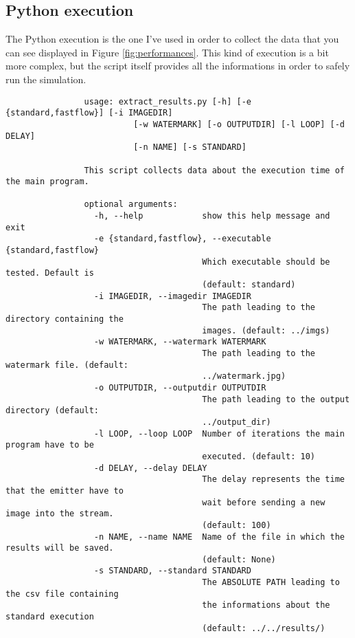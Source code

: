         \subsection{Python execution} %
        \label{sub:python_execution}
            The Python execution is the one I've used in order to collect the data that you can see displayed in
            Figure \ref{fig:performances}. This kind of execution is a bit more complex, but the script itself
            provides all the informations in order to safely run the simulation.

            \begin{verbatim}
                usage: extract_results.py [-h] [-e {standard,fastflow}] [-i IMAGEDIR]
                          [-w WATERMARK] [-o OUTPUTDIR] [-l LOOP] [-d DELAY]
                          [-n NAME] [-s STANDARD]

                This script collects data about the execution time of the main program.

                optional arguments:
                  -h, --help            show this help message and exit
                  -e {standard,fastflow}, --executable {standard,fastflow}
                                        Which executable should be tested. Default is
                                        (default: standard)
                  -i IMAGEDIR, --imagedir IMAGEDIR
                                        The path leading to the directory containing the
                                        images. (default: ../imgs)
                  -w WATERMARK, --watermark WATERMARK
                                        The path leading to the watermark file. (default:
                                        ../watermark.jpg)
                  -o OUTPUTDIR, --outputdir OUTPUTDIR
                                        The path leading to the output directory (default:
                                        ../output_dir)
                  -l LOOP, --loop LOOP  Number of iterations the main program have to be
                                        executed. (default: 10)
                  -d DELAY, --delay DELAY
                                        The delay represents the time that the emitter have to
                                        wait before sending a new image into the stream.
                                        (default: 100)
                  -n NAME, --name NAME  Name of the file in which the results will be saved.
                                        (default: None)
                  -s STANDARD, --standard STANDARD
                                        The ABSOLUTE PATH leading to the csv file containing
                                        the informations about the standard execution
                                        (default: ../../results/)
            \end{verbatim}

